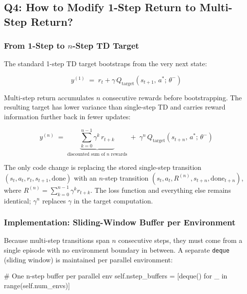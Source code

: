 \documentclass[12pt,a4paper]{report}
\begin{document}
\subsection*{Q4: How to Modify 1-Step Return to Multi-Step Return?}

\subsubsection*{From 1-Step to $n$-Step TD Target}

The standard 1-step TD target bootstraps from the very next state:

\begin{equation}
  y^{(1)} \;=\; r_t + \gamma\, Q_{\text{target}}(s_{t+1},\, a^*;\,\theta^-)
\end{equation}

Multi-step return accumulates $n$ consecutive rewards before bootstrapping.
The resulting target has lower variance than single-step TD and carries reward
information further back in fewer updates:

\begin{equation}
  y^{(n)} \;=\;
  \underbrace{\sum_{k=0}^{n-1} \gamma^k\, r_{t+k}}_{\text{discounted sum of }n\text{ rewards}}
  \;+\;
  \gamma^n\, Q_{\text{target}}(s_{t+n},\, a^*;\,\theta^-)
\end{equation}

The only code change is replacing the stored single-step transition
$(s_t, a_t, r_t, s_{t+1}, \text{done})$
with an $n$-step transition
$(s_t, a_t, R^{(n)}, s_{t+n}, \text{done}_{t+n})$,
where $R^{(n)} = \sum_{k=0}^{n-1} \gamma^k r_{t+k}$.
The loss function and everything else remains identical;
$\gamma^n$ replaces $\gamma$ in the target computation.

\subsubsection*{Implementation: Sliding-Window Buffer per Environment}

Because multi-step transitions span $n$ consecutive steps,
they must come from a single episode with no environment boundary in between.
A separate \texttt{deque} (sliding window) is maintained per parallel environment:

\begin{pycode}
# One n-step buffer per parallel env
self.nstep_buffers = [deque() for _ in range(self.num_envs)]
\end{pycode}
\end{document}
